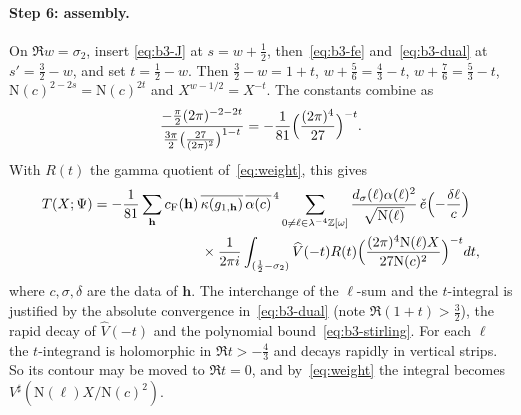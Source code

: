 \documentclass[11pt]{article}
\numberwithin{equation}{section}
\newcommand{\OO}{\mathbb Z[\omega]}
\newcommand{\N}{\mathrm N}
\newcommand{\ce}{\check e}
\begin{document}
\paragraph{Step 6: assembly.} On $\Re w=\sigma_2$, insert
\eqref{eq:b3-J} at $s=w+\frac12$, then~\eqref{eq:b3-fe}
and~\eqref{eq:b3-dual} at $s'=\frac32-w$, and set $t=\frac12-w$. Then
$\frac32-w=1+t$, $w+\frac56=\frac43-t$, $w+\frac76=\frac53-t$,
$\N(c)^{2-2s}=\N(c)^{2t}$ and $X^{w-1/2}=X^{-t}$. The constants combine
as
\begin{equation}\label{eq:d118}
 \frac{-\frac\pi2(2\pi)^{-2-2t}}{\frac{3\pi}2\bigl(\frac{27}{(2\pi)^2}
 \bigr)^{1-t}}=-\frac1{81}\Bigl(\frac{(2\pi)^4}{27}\Bigr)^{-t}.
\end{equation}
With $R(t)$ the gamma quotient of~\eqref{eq:weight}, this gives
\begin{equation}\label{eq:d119}
\begin{split}
 T(X;\Psi)=-\frac1{81}\sum_{\mathbf h}c_{\rm F}(\mathbf h)\,
 &\overline{\kappa(g_{1,\mathbf h})}\,\overline{\alpha(c)}^{\,4}
 \sum_{0\ne\ell\in\lambda^{-4}\OO}\frac{d_\sigma(\ell)\alpha(\ell)^2}
 {\sqrt{\N(\ell)}}\,\ce\Bigl(-\frac{\delta\ell}c\Bigr)\\
 &\times\frac1{2\pi i}\int_{(\frac12-\sigma_2)}\widehat V(-t)R(t)
 \Bigl(\frac{(2\pi)^4\N(\ell)X}{27\N(c)^2}\Bigr)^{-t}dt,
\end{split}
\end{equation}
where $c,\sigma,\delta$ are the data of $\mathbf h$. The interchange of
the $\ell$-sum and the $t$-integral is justified by the absolute
convergence in~\eqref{eq:b3-dual} (note $\Re(1+t)>\frac32$), the rapid
decay of $\widehat V(-t)$ and the polynomial bound~\eqref{eq:b3-stirling}.
For each $\ell$ the $t$-integrand is holomorphic in $\Re t>-\frac43$ and
decays rapidly in vertical strips. So its contour may be moved to
$\Re t=0$, and by~\eqref{eq:weight} the integral becomes
$V^\sharp(\N(\ell)X/\N(c)^2)$.
\end{document}
